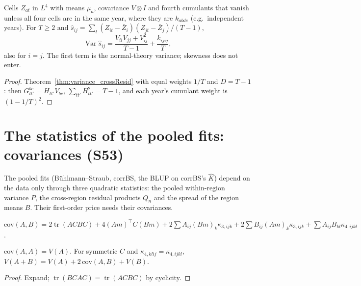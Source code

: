 \begin{theorem}\label{thm:variance_sampleCov}
  \leanok
  Cells $Z_{at}$ in $L^4$ with means $\mu_a$, covariance $V\otimes I$ and fourth cumulants that
  vanish unless all four cells are in the same year, where they are $k_{abde}$ (e.g.\ independent
  years). For $T\ge 2$ and
  $\hat s_{ij} = \sum_t(Z_{it} - \bar Z_i)(Z_{jt} - \bar Z_j)/(T-1)$,
  \[ \operatorname{Var}\hat s_{ij} = \frac{V_{ii}V_{jj} + V_{ij}^2}{T-1} + \frac{k_{ijij}}{T}, \]
  also for $i = j$. The first term is the normal-theory variance; skewness does not enter.
\end{theorem}
\begin{proof}
  \leanok
  Theorem~\ref{thm:variance_crossResid} with equal weights $1/T$ and $D = T - 1$: then
  $G^{bc}_{tt'} = H_{tt'}V_{bc}$, $\sum_{tt'}H_{tt'}^2 = T - 1$, and each year's cumulant weight is
  $(1 - 1/T)^2$.
\end{proof}

\section{The statistics of the pooled fits: covariances (S53)}

The pooled fits (Bühlmann--Straub, corrBS, the BLUP on corrBS's $\hat K$) depend on the data
only through three quadratic statistics: the pooled within-region variance $P$, the
cross-region residual products $Q_n$ and the spread of the region means $B$. Their first-order
price needs their covariances.

\begin{definition}\label{def:covQuad}
  \leanok
  $\mathrm{cov}(A, B) = 2\operatorname{tr}(ACBC) + 4(Am)^\top C(Bm)
  + 2\sum A_{ij}(Bm)_k\kappa_{3,ijk} + 2\sum B_{ij}(Am)_k\kappa_{3,ijk}
  + \sum A_{ij}B_{kl}\kappa_{4,ijkl}$.
\end{definition}

\begin{lemma}[Polarization]\label{lem:varQuad_add}
  \leanok
  $\mathrm{cov}(A, A) = V(A)$. For symmetric $C$ and $\kappa_{4,klij} = \kappa_{4,ijkl}$,
  $V(A + B) = V(A) + 2\,\mathrm{cov}(A, B) + V(B)$.
\end{lemma}
\begin{proof}
  \leanok
  Expand; $\operatorname{tr}(BCAC) = \operatorname{tr}(ACBC)$ by cyclicity.
\end{proof}

